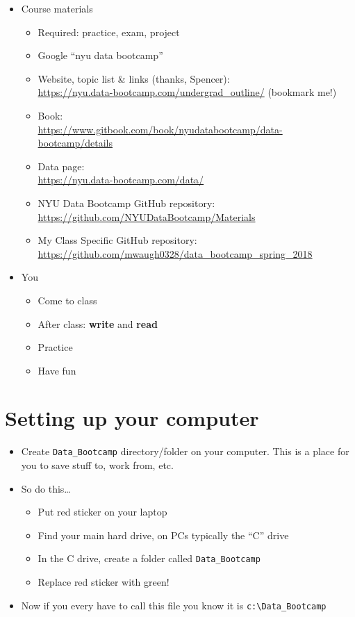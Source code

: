 \begin{itemize}
\item Course materials
\begin{itemize}
\item Required:  practice, exam, project
\item Google ``nyu data bootcamp''
\item Website, topic list \& links  (thanks, Spencer):\\ \url{https://nyu.data-bootcamp.com/undergrad_outline/}  (bookmark me!)
\item Book: \\ \url{https://www.gitbook.com/book/nyudatabootcamp/data-bootcamp/details}
\item Data page: \\
\url{https://nyu.data-bootcamp.com/data/}
\item NYU Data Bootcamp GitHub repository:  \url{https://github.com/NYUDataBootcamp/Materials}
\item My Class Specific GitHub repository: \url{https://github.com/mwaugh0328/data_bootcamp_spring_2018}
\end{itemize}

\item You
\begin{itemize}
\item Come to class
\item After class:  {\bf write} and {\bf read}
\item Practice
\item Have fun
\end{itemize}
\end{itemize}

\section*{Setting up your computer}
\begin{itemize}
\item Create \verb|Data_Bootcamp| directory/folder on your computer. This is a place for you to save stuff to, work from, etc.
\item So do this\ldots
\begin{itemize}
\item Put red sticker on your laptop
\item Find your main hard drive, on PCs typically the ``C'' drive
\item In the C drive, create a folder called \verb|Data_Bootcamp|
\item Replace red sticker with green!
\end{itemize}
\item Now if you every have to call this file you know it is \verb|c:\Data_Bootcamp|
\end{itemize}

